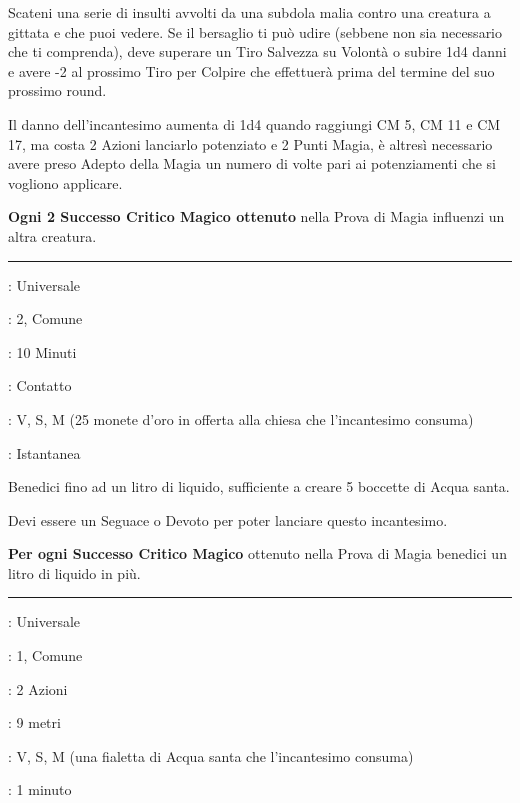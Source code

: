 \begin{multicols}{2}
Scateni una serie di insulti avvolti da una subdola malia contro una creatura a gittata e che puoi vedere. Se il bersaglio ti può udire (sebbene non sia necessario che ti comprenda), deve superare un Tiro Salvezza su Volontà o subire 1d4 danni e avere -2 al prossimo Tiro per Colpire che effettuerà prima del termine del suo prossimo round.

Il danno dell'incantesimo aumenta di 1d4 quando raggiungi CM 5, CM 11 e CM 17, ma costa 2 Azioni lanciarlo potenziato e 2 Punti Magia, è altresì necessario avere preso Adepto della Magia un numero di volte pari ai potenziamenti che si vogliono applicare.

\textbf{Ogni 2 Successo Critico Magico ottenuto} nella Prova di Magia influenzi un altra creatura.

\smallskip\noindent\rule{\linewidth}{2pt} \hypertarget{Benedici Acqua}{}\medskip{}
\noindent
\begin{description}[noitemsep, topsep=0pt, parsep=0pt, partopsep=0pt, leftmargin=0cm, labelwidth=2.8cm]
	\item[\textbf{Lista di Magia}]: Universale
	\item[\textbf{Livello}]: 2, Comune
	\item[\textbf{T. di Lancio}]: 10 Minuti
	\item[\textbf{Gittata}]: Contatto
	\item[\textbf{Componenti}]: V, S, M (25 monete d'oro in offerta alla chiesa che l'incantesimo consuma)
	\item[\textbf{Durata}]: Istantanea
\end{description}

Benedici fino ad un litro di liquido, sufficiente a creare 5 boccette di Acqua santa.

Devi essere un Seguace o Devoto per poter lanciare questo incantesimo.

\textbf{Per ogni Successo Critico Magico} ottenuto nella Prova di Magia benedici un litro di liquido in più.

\smallskip\noindent\rule{\linewidth}{2pt} \hypertarget{Benedizione}{}\medskip{}
\noindent
\begin{description}[noitemsep, topsep=0pt, parsep=0pt, partopsep=0pt, leftmargin=0cm, labelwidth=2.8cm]
	\item[\textbf{Lista di Magia}]: Universale
	\item[\textbf{Livello}]: 1, Comune
	\item[\textbf{T. di Lancio}]: 2 Azioni
	\item[\textbf{Gittata}]: 9 metri
	\item[\textbf{Componenti}]: V, S, M (una fialetta di Acqua santa che l'incantesimo consuma)
	\item[\textbf{Durata}]: 1 minuto
\end{description}


\end{multicols}
